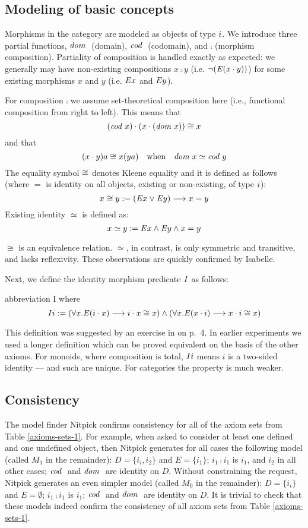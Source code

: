 \subsection{Modeling of basic concepts}
Morphisms in the category are modeled as objects of type $i$. We introduce three partial functions, 
$\textit{dom \/}$ (domain), $\textit{cod \/}$ (codomain), and $\comp$ (morphism composition). 
Partiality of composition is handled exactly as expected: we generally may have 
non-existing compositions $x\comp y$ (i.e. $\neg(\mathit{E}(x\cdot y))$) for some existing  
morphisms $x$ and $y$ (i.e. $\mathit{E} x$ and $\mathit{E} y$).

For composition $\comp$ we assume set-theoretical composition here (i.e., functional 
composition from right to left). This means that
\[(\textit{cod \/} x) \cdot (x \cdot (\textit{dom \/} x)) \cong x\] 
and that 
\[(x \cdot y)a \cong x(y a) \quad \text{when}\quad
\textit{dom \/} x \simeq \textit{cod \/} y\] 
The equality symbol $\cong$ denotes Kleene equality and it
is defined as follows (where $=$ is identity on all objects, existing or non-existing, 
of type $i$):
\[x \cong y := (\mathit{E} x \vee \mathit{E} y) \longrightarrow x = y\]
Existing identity $\simeq$ is defined as:
\[x \simeq y := \mathit{E} x \wedge \mathit{E} y \wedge  x = y\]

$\cong$ is an equivalence relation. $\simeq$, in contrast, is only symmetric and transitive, and lacks 
reflexivity. These observations are quickly confirmed by Isabelle.


Next, we define the identity morphism predicate $\textit{I\/}$ as follows: 

abbreviation I where \[\textit{I\/} i := (\forall x. \mathit{E}(i \cdot x) \longrightarrow i \cdot
x \cong x) \wedge (\forall x. \mathit{E}(x \cdot i) \longrightarrow x \cdot i \cong x)\]

This definition was suggested by an exercise in \cite{FreydScedrov90}
on p.~4.  In earlier experiments we used a longer definition which can
be proved equivalent on the basis of the other axioms. For monoids,
where composition is total, $\textit{I\/} i$ means $i$ is a two-sided identity
— and such are unique. For categories the property is much weaker.
 

\subsection{Consistency}
The model finder Nitpick confirms consistency for all of the axiom
sets from Table \ref{axioms-sets-1}. For example, when asked to consider at least one defined and one undefined object, then
Nitpick generates for all cases the following model (called $M_1$ in the remainder):
$D=\{i_i,i_2\}$ and $E=\{i_1\}$;  $i_1\comp i_1$ is $i_1$,  and $i_2$
in all other cases; $\textit{cod \/}$ and $\textit{dom \/}$ are identity on $D$. Without constraining the request, Nitpick
generates an even simpler model (called $M_0$ in the remainder):
$D=\{i_i\}$ and $E=\emptyset$; $i_1\comp i_1$ is $i_1$; $\textit{cod \/}$ and
$\textit{dom \/}$ are identity on $D$. It is trivial to check that these models
indeed confirm the consistency of all axiom sets from Table \ref{axioms-sets-1}.

